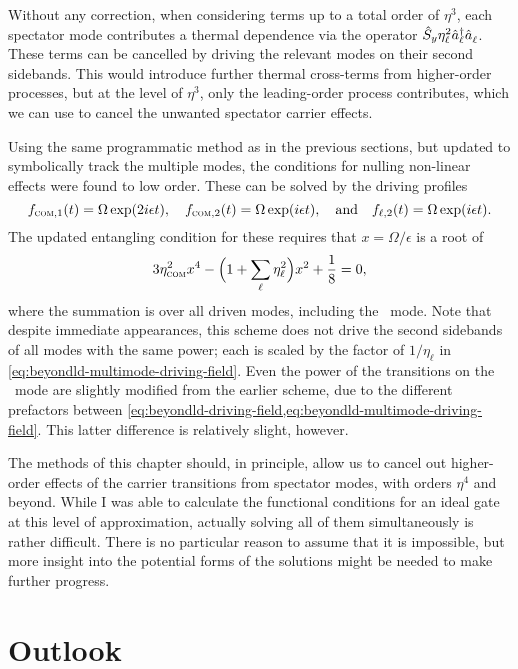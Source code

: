 Without any correction, when considering terms up to a total order of $\eta^3$, each spectator mode contributes a thermal dependence via the operator $\hat{S}_y\eta_\ell^2\hat{a}^{\smash\dagger}_\ell\hat{a}^{}_\ell$.
These terms can be cancelled by driving the relevant modes on their second sidebands.
This would introduce further thermal cross-terms from higher-order processes, but at the level of $\eta^3$, only the leading-order process contributes, which we can use to cancel the unwanted spectator carrier effects.

Using the same programmatic method as in the previous sections, but updated to symbolically track the multiple modes, the conditions for nulling non-linear effects were found to low order.
These can be solved by the driving profiles
\begin{equation}
f_{{\textsc{com}},1}(t) = \Omega\exp(2i\epsilon t),\quad f_{{\textsc{com}},2}(t) = \Omega\exp(i\epsilon t), \quad\text{and}\quad f_{\ell,2}(t) = \Omega\exp(i\epsilon t).
\end{equation}
The updated entangling condition for these requires that $x = \Omega/\epsilon$ is a root of
\begin{equation}
3\eta_{\textsc{com}}^2x^4 - \Bigl(1 + \sum_\ell \eta^2_\ell\Bigr)x^2 + \frac18 = 0,
\end{equation}
where the summation is over all driven modes, including the \com\ mode.
Note that despite immediate appearances, this scheme does not drive the second sidebands of all modes with the same power; each is scaled by the factor of $1/\eta_\ell$ in \cref{eq:beyondld-multimode-driving-field}.
Even the power of the transitions on the \com\ mode are slightly modified from the earlier scheme, due to the different prefactors between \cref{eq:beyondld-driving-field,eq:beyondld-multimode-driving-field}.
This latter difference is relatively slight, however.

The methods of this chapter should, in principle, allow us to cancel out higher-order effects of the carrier transitions from spectator modes, with orders $\eta^4$ and beyond.
While I was able to calculate the functional conditions for an ideal gate at this level of approximation, actually solving all of them simultaneously is rather difficult.
There is no particular reason to assume that it is impossible, but more insight into the potential forms of the solutions might be needed to make further progress.


\section{Outlook}

